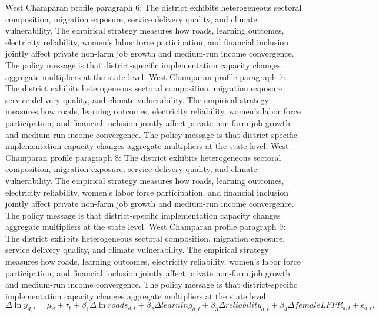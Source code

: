 \documentclass[preprint,12pt]{elsarticle}
\begin{document}
West Champaran profile paragraph 6: The district exhibits heterogeneous sectoral composition, migration exposure, service delivery quality, and climate vulnerability. The empirical strategy measures how roads, learning outcomes, electricity reliability, women's labor force participation, and financial inclusion jointly affect private non-farm job growth and medium-run income convergence. The policy message is that district-specific implementation capacity changes aggregate multipliers at the state level.
West Champaran profile paragraph 7: The district exhibits heterogeneous sectoral composition, migration exposure, service delivery quality, and climate vulnerability. The empirical strategy measures how roads, learning outcomes, electricity reliability, women's labor force participation, and financial inclusion jointly affect private non-farm job growth and medium-run income convergence. The policy message is that district-specific implementation capacity changes aggregate multipliers at the state level.
West Champaran profile paragraph 8: The district exhibits heterogeneous sectoral composition, migration exposure, service delivery quality, and climate vulnerability. The empirical strategy measures how roads, learning outcomes, electricity reliability, women's labor force participation, and financial inclusion jointly affect private non-farm job growth and medium-run income convergence. The policy message is that district-specific implementation capacity changes aggregate multipliers at the state level.
West Champaran profile paragraph 9: The district exhibits heterogeneous sectoral composition, migration exposure, service delivery quality, and climate vulnerability. The empirical strategy measures how roads, learning outcomes, electricity reliability, women's labor force participation, and financial inclusion jointly affect private non-farm job growth and medium-run income convergence. The policy message is that district-specific implementation capacity changes aggregate multipliers at the state level.
\begin{equation}\Delta \ln y_{d,t}=\mu_d+\tau_t+\beta_1\Delta\ln roads_{d,t}+\beta_2\Delta learning_{d,t}+\beta_3\Delta reliability_{d,t}+\beta_4\Delta femaleLFPR_{d,t}+\epsilon_{d,t}.\end{equation}
\end{document}
